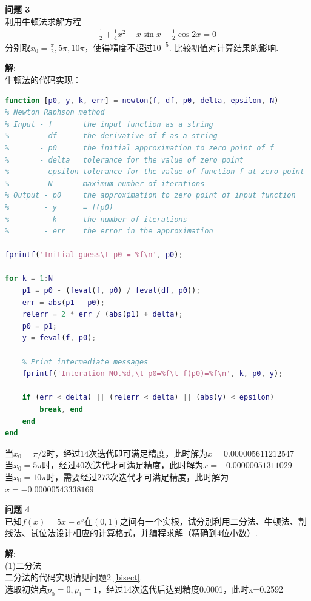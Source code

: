 \documentclass[UTF8]{ctexart}
\newenvironment{problem}[2][问题]
{\begin{mdframed}[backgroundcolor=gray!20] \textbf{#1 #2} \\}
	{\end{mdframed}}
\begin{document}
\begin{problem}{3}
	利用牛顿法求解方程
	\begin{align}
		\frac{1}{2}+\frac{1}{4} x^{2}-x \sin x-\frac{1}{2} \cos 2 x=0
	\end{align}
	分别取$x_{0}=\frac{\pi}{2}, 5 \pi, 10 \pi$，使得精度不超过$10^{-5}$. 比较初值对计算结果的影响.
\end{problem}
\textbf{解}:\\
牛顿法的代码实现：
\begin{lstlisting}[language=matlab]
function [p0, y, k, err] = newton(f, df, p0, delta, epsilon, N)
% Newton Raphson method
% Input - f       the input function as a string
%       - df      the derivative of f as a string
%       - p0      the initial approximation to zero point of f
%       - delta   tolerance for the value of zero point
%       - epsilon tolerance for the value of function f at zero point
%       - N       maximum number of iterations
% Output - p0     the approximation to zero point of input function
%        - y      = f(p0)
%        - k      the number of iterations
%        - err    the error in the approximation

fprintf('Initial guess\t p0 = %f\n', p0);

for k = 1:N
	p1 = p0 - (feval(f, p0) / feval(df, p0));
	err = abs(p1 - p0);
	relerr = 2 * err / (abs(p1) + delta);
	p0 = p1;
	y = feval(f, p0);

	% Print intermediate messages
	fprintf('Interation NO.%d,\t p0=%f\t f(p0)=%f\n', k, p0, y);

	if (err < delta) || (relerr < delta) || (abs(y) < epsilon)
		break, end
	end
end
\end{lstlisting}\label{newton}
当$x_0=\pi/2$时，经过$14$次迭代即可满足精度，此时解为$x=0.000005611212547$\\
当$x_0=5\pi$时，经过$40$次迭代才可满足精度，此时解为$x=-0.00000051311029$\\
当$x_0=10\pi$时，需要经过$273$次迭代才可满足精度，此时解为$x=-0.00000543338169$

\begin{problem}{4}
	已知$f(x)=5 x-e^{x}$在$(0,1)$之间有一个实根，试分别利用二分法、牛顿法、割线法、试位法设计相应的计算格式，并编程求解（精确到4位小数）.
\end{problem}
\textbf{解}:\\

(1)二分法\\
二分法的代码实现请见问题2 \ref{bisect}.\\
选取初始点$p_0=0,p_1=1$，经过14次迭代后达到精度0.0001，此时x=0.2592
\end{document}
